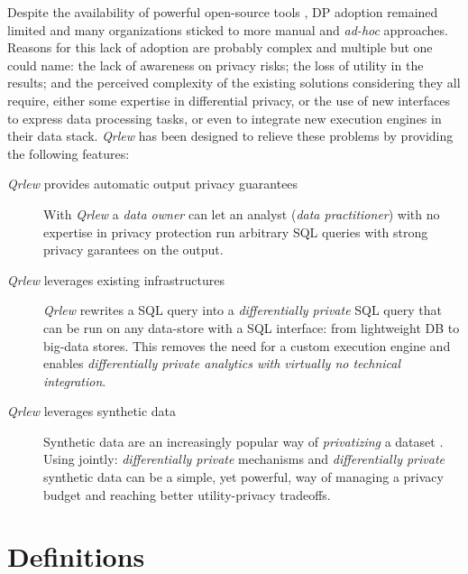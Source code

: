 \documentclass[letterpaper]{article} %
\newcommand{\qrlew}{\emph{Qrlew}}
\begin{document}
Despite the availability of powerful open-source tools \cite{kotsogiannis2019privatesql, diffprivlib, OpenDP, PipelineDP, ZetaSQL, PrivacyOnBeam, johnson2020chorus, berghel2022tumult, yousefpour2021opacus}, DP adoption remained limited and many organizations sticked to more manual and \emph{ad-hoc} approaches.
Reasons for this lack of adoption are probably complex and multiple but one could name: the lack of awareness on privacy risks; the loss of utility in the results; and the perceived complexity of the existing solutions considering they all require, either some expertise in differential privacy, or the use of new interfaces to express data processing tasks, or even to integrate new execution engines in their data stack.
\qrlew{} \cite{Grislain_Qrlew_2023} has been designed to relieve these problems by providing the following features:
\begin{description}
    \item[\qrlew{} provides automatic output privacy guarantees]
    With \qrlew{} a \emph{data owner} can let an analyst (\emph{data practitioner}) with no expertise in privacy protection run arbitrary SQL queries with strong privacy garantees on the output.
    \item[\qrlew{} leverages existing infrastructures]
    \qrlew{} rewrites a SQL query into a \emph{differentially private} SQL query that can be run on any data-store with a SQL interface: from lightweight DB to big-data stores.
This removes the need for a custom execution engine and enables \emph{differentially private analytics with virtually no technical integration}.
    \item[\qrlew{} leverages synthetic data]
    Synthetic data are an increasingly popular way of \emph{privatizing} a dataset \cite{bowen2019comparative, mckenna2021winning, canale2022generative, sablayrolles2023privately, castellon2023dp}. Using jointly: \emph{differentially private} mechanisms and \emph{differentially private} synthetic data can be a simple, yet powerful, way of managing a privacy budget and reaching better utility-privacy tradeoffs.
\end{description}


\section{Definitions}
\end{document}
